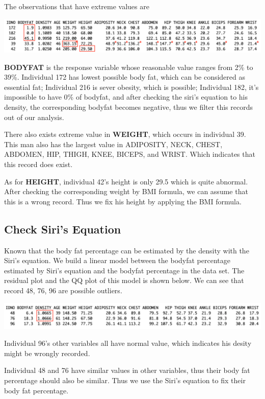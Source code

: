 \documentclass[11pt]{article}
\makeatletter
\def\maxwidth{\ifdim\Gin@nat@width>\linewidth\linewidth
    \else\Gin@nat@width\fi}
\let\Oldincludegraphics\includegraphics
\renewcommand{\includegraphics}[1]{\Oldincludegraphics[width=.8\maxwidth]{#1}}
\makeatother
\begin{document}
The observations that have extreme values are

\includegraphics{plots/data1.png}

    \textbf{BODYFAT} is the response variable whose reasonable value ranges
from 2\% to 39\%. Individual 172 has lowest possible body fat, which can
be considered as essential fat; Individual 216 is sever obesity, which
is possible; Individual 182, it's impossible to have 0\% of bodyfat, and
after checking the siri's equation to his density, the corresponding
bodyfat becomes negative, thus we filter this records out of our
analysis.

There also exists extreme value in \textbf{WEIGHT}, which occurs in
individual 39. This man also has the largest value in ADIPOSITY, NECK,
CHEST, ABDOMEN, HIP, THIGH, KNEE, BICEPS, and WRIST. Which indicates
that this record does exist.

As for \textbf{HEIGHT}, individual 42's height is only 29.5 which is
quite abnormal. After checking the corresponding weight by BMI formula,
we can assume that this is a wrong record. Thus we fix his height by
applying the BMI formula.

    \hypertarget{check-siris-equation}{%
\subsection{Check Siri's Equation}\label{check-siris-equation}}

Known that the body fat percentage can be estimated by the density with
the Siri's equation. We build a linear model between the bodyfat
percentage estimated by Siri's equation and the bodyfat percentage in
the data set. The residual plot and the QQ plot of this model is shown
below. We can see that record 48, 76, 96 are possible outliers.

\includegraphics{plots/data2_1.png}

    Individual 96's other variables all have normal value, which indicates
his desity might be wrongly recorded.

Individual 48 and 76 have similar values in other variables, thus their
body fat percentage should also be similar. Thus we use the Siri's
equation to fix their body fat percentage.
\end{document}
